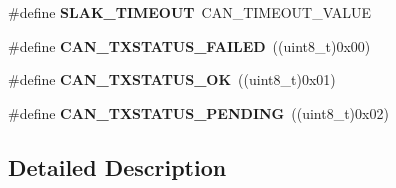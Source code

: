 \begin{DoxyCompactItemize}
\item 
\mbox{\label{group___h_a_l___c_a_n___aliased___defines_ga1bb8107706c8b4039ac55a122f3c65bb}} 
\#define {\bfseries S\+L\+A\+K\+\_\+\+T\+I\+M\+E\+O\+UT}~C\+A\+N\+\_\+\+T\+I\+M\+E\+O\+U\+T\+\_\+\+V\+A\+L\+UE
\item 
\mbox{\label{group___h_a_l___c_a_n___aliased___defines_gad6f04a4437ad8e83b154523f20985796}} 
\#define {\bfseries C\+A\+N\+\_\+\+T\+X\+S\+T\+A\+T\+U\+S\+\_\+\+F\+A\+I\+L\+ED}~((uint8\+\_\+t)0x00)
\item 
\mbox{\label{group___h_a_l___c_a_n___aliased___defines_ga01cd38ecda448043ba6a7870ab62fc2b}} 
\#define {\bfseries C\+A\+N\+\_\+\+T\+X\+S\+T\+A\+T\+U\+S\+\_\+\+OK}~((uint8\+\_\+t)0x01)
\item 
\mbox{\label{group___h_a_l___c_a_n___aliased___defines_gaf63b6b17ef36507122e0eaac8395aa1c}} 
\#define {\bfseries C\+A\+N\+\_\+\+T\+X\+S\+T\+A\+T\+U\+S\+\_\+\+P\+E\+N\+D\+I\+NG}~((uint8\+\_\+t)0x02)
\end{DoxyCompactItemize}


\subsection{Detailed Description}
